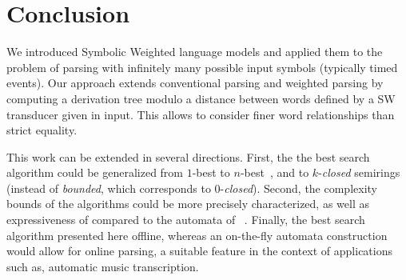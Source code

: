 \section*{Conclusion}

We  introduced Symbolic Weighted language models %
and applied them to the problem of parsing
with infinitely many possible input symbols (typically timed events).
Our approach extends conventional parsing and weighted parsing
by computing a derivation tree modulo
a distance between words
defined by a SW transducer given in input.
This allows to consider finer word relationships than strict equality.
%

This work can be extended in several directions. First, the
the best search algorithm could be generalized from $1$-best to $n$-best~\cite{Huang05kbest},
and to $k$-\emph{closed} semirings~\cite{Mohri02semiring}
(instead of \emph{bounded}, which corresponds to $0$-\emph{closed}). Second,
the complexity bounds of the algorithms could be more precisely characterized,
as well as expressiveness of \swM compared to the automata of 
\eg~\cite{Segoufin06csl,KaminskiFrancez94,NevenSchwentickVianu04FSMinfinite,Bojanczyk11FO2}.
Finally, the  best search algorithm presented here offline, whereas
an on-the-fly automata construction would allow for online parsing,
a suitable feature in the context of applications such as, 
\eg automatic music transcription.


\newpage


%
%
%






\newpage
\appendix

